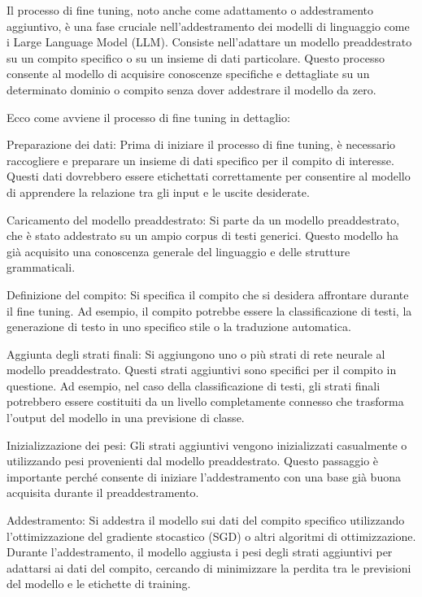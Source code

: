 Il processo di fine tuning, noto anche come adattamento o addestramento aggiuntivo, è una fase cruciale nell'addestramento dei modelli di linguaggio come i Large Language Model (LLM). Consiste nell'adattare un modello preaddestrato su un compito specifico o su un insieme di dati particolare. Questo processo consente al modello di acquisire conoscenze specifiche e dettagliate su un determinato dominio o compito senza dover addestrare il modello da zero.

Ecco come avviene il processo di fine tuning in dettaglio:

Preparazione dei dati: Prima di iniziare il processo di fine tuning, è necessario raccogliere e preparare un insieme di dati specifico per il compito di interesse. Questi dati dovrebbero essere etichettati correttamente per consentire al modello di apprendere la relazione tra gli input e le uscite desiderate.

Caricamento del modello preaddestrato: Si parte da un modello preaddestrato, che è stato addestrato su un ampio corpus di testi generici. Questo modello ha già acquisito una conoscenza generale del linguaggio e delle strutture grammaticali.

Definizione del compito: Si specifica il compito che si desidera affrontare durante il fine tuning. Ad esempio, il compito potrebbe essere la classificazione di testi, la generazione di testo in uno specifico stile o la traduzione automatica.

Aggiunta degli strati finali: Si aggiungono uno o più strati di rete neurale al modello preaddestrato. Questi strati aggiuntivi sono specifici per il compito in questione. Ad esempio, nel caso della classificazione di testi, gli strati finali potrebbero essere costituiti da un livello completamente connesso che trasforma l'output del modello in una previsione di classe.

Inizializzazione dei pesi: Gli strati aggiuntivi vengono inizializzati casualmente o utilizzando pesi provenienti dal modello preaddestrato. Questo passaggio è importante perché consente di iniziare l'addestramento con una base già buona acquisita durante il preaddestramento.

Addestramento: Si addestra il modello sui dati del compito specifico utilizzando l'ottimizzazione del gradiente stocastico (SGD) o altri algoritmi di ottimizzazione. Durante l'addestramento, il modello aggiusta i pesi degli strati aggiuntivi per adattarsi ai dati del compito, cercando di minimizzare la perdita tra le previsioni del modello e le etichette di training.

